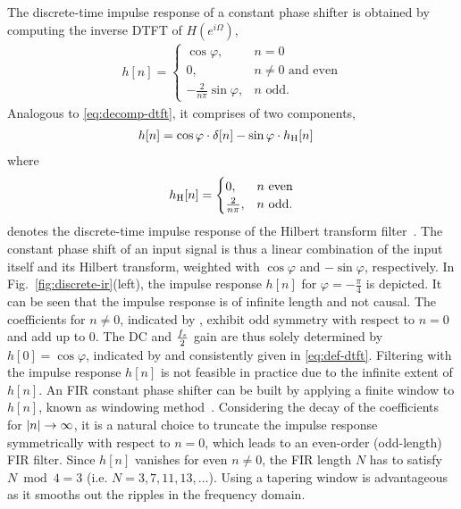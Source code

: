 %
\NewL The discrete-time impulse response of a constant phase shifter
is obtained by computing the inverse DTFT of $H(e^{i\Omega})$,
\begin{align}
h[n] =
\begin{cases}
\cos\varphi, & n = 0\\
0, & \text{$n \neq 0$ and even}\\
-\frac{2}{n \pi} \sin\varphi, & \text{$n$ odd}.
\end{cases}
\label{eq:discrete-ir}
\end{align}
Analogous to \eqref{eq:decomp-dtft},
it comprises of two components,
\begin{align}
h[n] &= \cos\varphi\cdot\delta[n]
- \sin\varphi \cdot \hh[n]
\label{eq:decomp-ir}
\end{align}
where
\begin{align}
h_{\mathrm{H}}[n] =
\begin{cases}
0,& \text{$n$ even}\\
\tfrac{2}{n\pi},& \text{$n$ odd}.
\end{cases}
\end{align}
denotes the discrete-time impulse response of
the Hilbert transform filter~\cite[Eq.~(11.65)]{oppenheim}.
The constant phase shift of an input signal is
thus a linear combination of the input itself and its Hilbert transform,
weighted with $\cos\varphi$ and $-\sin\varphi$, respectively.
%
\NewL In Fig.~\ref{fig:discrete-ir}(left),
the impulse response $h[n]$ for $\varphi=-\tfrac{\pi}{4}$ is depicted.
It can be seen that the impulse response is
of infinite length and not causal.
The coefficients for $n\!\neq\!0$, indicated by ,
exhibit odd symmetry with respect to $n=0$ and add up to 0.
The DC and $\frac{{f}_{s}}{2}$ gain are thus solely determined by $h[0]=\cos\varphi$,
indicated by 
and consistently given in \eqref{eq:def-dtft}.
%
\NewL Filtering with the impulse response $h[n]$ is not feasible in practice
due to the infinite extent of $h[n]$.
An FIR constant phase shifter can be built by applying a finite window to $h[n]$,
known as windowing method~\cite[Sec.~7.2]{oppenheim}.
Considering the decay of the coefficients for $\left\vert{n}\right\vert\to\infty$,
it is a natural choice to truncate the impulse response
symmetrically with respect to $n=0$, which leads to
an even-order (odd-length) FIR filter.
Since $h[n]$ vanishes for even $n\neq 0$,
the FIR length $N$ has to satisfy $N\bmod 4 = 3$
(i.e. $N = 3, 7, 11, 13, \ldots$).
Using a tapering window is advantageous
as it smooths out the ripples in the frequency domain.
